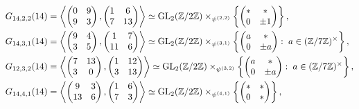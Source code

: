 \begin{equation}
\begin{split}
G_{14,2,2}(14) &= \left\langle \begin{pmatrix} 0 & 9 \\ 9 & 3 \end{pmatrix}, \begin{pmatrix} 1 & 6 \\ 7 & 13 \end{pmatrix} \right\rangle \simeq \operatorname{GL}_2(\mathbb{Z}/2\mathbb{Z}) \times_{\psi^{(2,2)}} \left\{ \begin{pmatrix} * & * \\ 0 & \pm 1 \end{pmatrix} \right\}, \\
G_{14,3,1}(14) &= \left\langle \begin{pmatrix} 9 & 4 \\ 3 & 5 \end{pmatrix}, \begin{pmatrix} 1 & 7 \\ 11 & 6 \end{pmatrix} \right\rangle \simeq \operatorname{GL}_2(\mathbb{Z}/2\mathbb{Z}) \times_{\psi^{(3,1)}} \left\{ \begin{pmatrix} a & * \\ 0 & \pm a \end{pmatrix} : \; a \in (\mathbb{Z}/7\mathbb{Z})^\times \right\}, \\
G_{12,3,2}(14) &= \left\langle \begin{pmatrix} 7 & 13 \\ 3 & 0 \end{pmatrix}, \begin{pmatrix} 1 & 12 \\ 3 & 13 \end{pmatrix} \right\rangle \simeq \operatorname{GL}_2(\mathbb{Z}/2\mathbb{Z}) \times_{\psi^{(3,2)}} \left\{ \begin{pmatrix} a & * \\ 0 & \pm a \end{pmatrix} : \; a \in (\mathbb{Z}/7\mathbb{Z})^\times \right\}, \\
G_{14,4,1}(14) &= \left\langle \begin{pmatrix} 9 & 3 \\ 13 & 6 \end{pmatrix}, \begin{pmatrix} 1 & 6 \\ 7 & 3 \end{pmatrix} \right\rangle \simeq \operatorname{GL}_2(\mathbb{Z}/2\mathbb{Z}) \times_{\psi^{(4,1)}} \left\{ \begin{pmatrix} * & * \\ 0 & * \end{pmatrix} \right\},
\end{split}
\end{equation}
